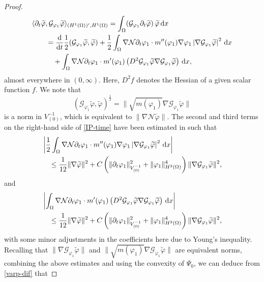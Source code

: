 \documentclass[11pt,reqno]{amsart}
\def\d{{\rm d}}
\def\l{\langle}
\def\r{\rangle}
\def\ddt{\frac{\d}{\d t}}
\begin{document}
\begin{proof}
%
\begin{align}
& \l \partial_t \widetilde{\varphi},\mathcal{G}_{\varphi_1}\widetilde{\varphi} \r_{(H^1(\Omega))',H^1(\Omega)}
= \int_\Omega (\mathcal{G}_{\varphi_1} \partial_t \widetilde{\varphi})  \,  \widetilde{\varphi}  \, \d x
\notag \\
&\qquad = \ddt \frac{1}{2} (\mathcal{G}_{\varphi_1} \widetilde{\varphi}, \widetilde{\varphi})
+\frac12 \int_\Omega \nabla \mathcal{N} \partial_t \varphi_1 \cdot m''(\varphi_1) \nabla \varphi_1 \left| \nabla \mathcal{G}_{\varphi_1} \widetilde{\varphi} \right|^2 \, \d x
\notag \\
&\qquad\quad  +  \int_\Omega \nabla \mathcal{N} \partial_t \varphi_1 \cdot  m'(\varphi_1) \left( D^2  \mathcal{G}_{\varphi_1} \widetilde{\varphi} \nabla \mathcal{G}_{\varphi_1} \widetilde{\varphi} \right) \, \d x,
\label{IP-time}
\end{align}
%
almost everywhere in $(0,\infty)$. Here, $D^2 f$ denotes the Hessian of a given scalar function $f$. We note that
$$
(\mathcal{G}_{\varphi_1} \widetilde{\varphi}, \widetilde{\varphi})^\frac12
= \big\|\sqrt{m(\varphi_1)}\nabla \mathcal{G}_{\varphi_1} \widetilde{\varphi}\big\|
$$
is a norm in $ V^{-1}_{(0)}$, which is equivalent to
$ \|\nabla \mathcal{N} \widetilde{\varphi}\|$.
The second and third terms on the right-hand side of \eqref{IP-time} have been estimated in \cite[(3.47), (3.50)]{CGGG} such that
%
\begin{align}
& \left|\frac12 \int_\Omega \nabla \mathcal{N} \partial_t \varphi_1 \cdot m''(\varphi_1) \nabla \varphi_1 \left| \nabla \mathcal{G}_{\varphi_1} \widetilde{\varphi} \right|^2 \, \d x\right|
\notag\\
&\quad\leq \frac{1}{12} \| \nabla \widetilde{\varphi}\|^2
 + C \left( \|\partial_t \varphi_1\|_{V^{-1}_{(0)}}^2+
 \|\varphi_1\|_{H^2(\Omega)}^4 \right)\|\nabla \mathcal{G}_{\varphi_1} \widetilde{\varphi}\|^2,
 \notag
\end{align}
and
\begin{align}
&\left|\int_\Omega \nabla \mathcal{N} \partial_t \varphi_1 \cdot  m'(\varphi_1) \left( D^2  \mathcal{G}_{\varphi_1} \widetilde{\varphi} \nabla \mathcal{G}_{\varphi_1} \widetilde{\varphi} \right) \, \d x\right|
\notag \\
&\quad \leq \frac{1}{12} \|\nabla \widetilde{\varphi}\|^2
 + C \left( \|\partial_t \varphi_1\|_{ V^{-1}_{(0)}}^2 +
 \| \varphi_1\|_{H^2(\Omega)}^4\right)
\|\nabla \mathcal{G}_{\varphi_1} \widetilde{\varphi}\|^2,
\notag
\end{align}
%
with some minor adjustments in the coefficients here due to Young's inequality.  Recalling that $\| \nabla \mathcal{G}_{\varphi_1} \widetilde{\varphi}\|$ and $\|\sqrt{m(\varphi_1)} \nabla \mathcal{G}_{\varphi_1} \widetilde{\varphi}\|$ are equivalent norms, combining the above estimates and using the convexity of $\Psi_0$, we can deduce from \eqref{varp-dif} that

\end{proof}
\end{document}
